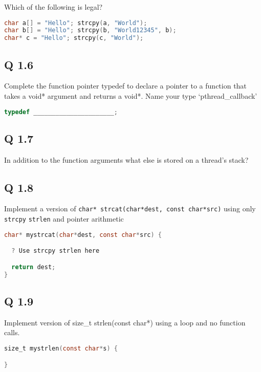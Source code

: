 Which of the following is legal?

\begin{lstlisting}[language=C]
char a[] = "Hello"; strcpy(a, "World");
char b[] = "Hello"; strcpy(b, "World12345", b);
char* c = "Hello"; strcpy(c, "World");
\end{lstlisting}

\subsection{Q 1.6}\label{q-1.6}

Complete the function pointer typedef to declare a pointer to a function that takes a void* argument and returns a void*. Name your type `pthread\_callback'

\begin{lstlisting}[language=C]
typedef ______________________;
\end{lstlisting}

\subsection{Q 1.7}\label{q-1.7}

In addition to the function arguments what else is stored on a thread's stack?

\subsection{Q 1.8}\label{q-1.8}

Implement a version of \texttt{char*\ strcat(char*dest,\ const\ char*src)} using only \texttt{strcpy} \texttt{strlen} and pointer arithmetic

\begin{lstlisting}[language=C]
char* mystrcat(char*dest, const char*src) {

  ? Use strcpy strlen here

  return dest;
}
\end{lstlisting}

\subsection{Q 1.9}\label{q-1.9}

Implement version of size\_t strlen(const char*) using a loop and no function calls.

\begin{lstlisting}[language=C]
size_t mystrlen(const char*s) {

}
\end{lstlisting}

